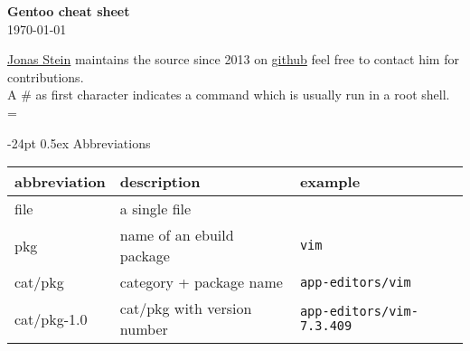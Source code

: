 \documentclass[landscape]{article}
\makeatletter
\renewcommand\section{\@startsection{section}{1}{0mm}%
                                     {-24pt}%
                                     {0.5ex}%
                                {\color{black}\normalfont\large\bfseries}}
\newcommand{\code}{\texttt}
\newcommand{\asroot}{\# }
\newcommand{\file}{{\color{magenta} file}\xspace}
\newcommand{\pkg}{{\color{blue} pkg}\xspace}
\newcommand{\cp}{{\color{blue} cat/pkg}\xspace}
\newcommand{\cpv}{{\color{blue} cat/pkg-1.0}\xspace}
\makeatother
\begin{document}
\footnotesize
\begin{multicols*}{2}

\setlength{\premulticols}{1pt}
\setlength{\postmulticols}{1pt}
\setlength{\multicolsep}{1pt}
\setlength{\columnsep}{2pt}

\begin{center}
     {\Large{\textbf{\color{black}Gentoo cheat sheet}}} \\
 \today
\end{center}
\href{mailto:news@jonasstein.de}{Jonas Stein} maintains 
the source since 2013 on \href{https://github.com/jonasstein/gentoo-cheat}{github} feel free to contact him for contributions.\\
A \asroot as first character indicates a command which is usually run in a root shell. 
\everypar={\hangindent=9mm}

\section{Abbreviations}

\begin{tabular}{lll}
\toprule abbreviation & description & example \\ 
\toprule \file  & a single \file &  \\ 
\midrule \pkg &  name of an ebuild package & \code{vim} \\ 
\midrule \cp & category + package name & \code{app-editors/vim} \\ 
\midrule \cpv & \cp with version number & \code{app-editors/vim-7.3.409}\\
\bottomrule 
\end{tabular} \\






\end{multicols*}
\end{document}
